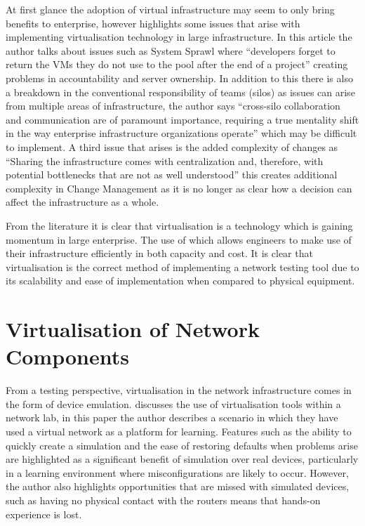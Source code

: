 \documentclass[11pt]{report}
\begin{document}
At first glance the adoption of virtual infrastructure may seem to only bring benefits to enterprise, however \citep{kotsovinos2010virtualization} highlights some issues that arise with implementing virtualisation technology in large infrastructure. In this article the author talks about issues such as System Sprawl where ``developers forget to return the VMs they do not use to the pool after the end of a project'' creating problems in accountability and server ownership. In addition to this there is also a breakdown in the conventional responsibility of teams (silos) as issues can arise from multiple areas of infrastructure, the author says ``cross-silo collaboration and communication are of paramount importance, requiring a true mentality shift in the way enterprise infrastructure organizations operate'' which may be difficult to implement. A third issue that arises is the added complexity of changes as ``Sharing the infrastructure comes with centralization and, therefore, with potential bottlenecks that are not as well understood'' this creates additional complexity in Change Management as it is no longer as clear how a decision can affect the infrastructure as a whole.

From the literature it is clear that virtualisation is a technology which is gaining momentum in large enterprise. The use of which allows engineers to make use of their infrastructure efficiently in both capacity and cost. It is clear that virtualisation is the correct method of implementing a network testing tool due to its scalability and ease of implementation when compared to physical equipment. 

\section{Virtualisation of Network Components}

From a testing perspective, virtualisation in the network infrastructure comes in the form of device emulation. \citep{galan2004use} discusses the use of virtualisation tools within a network lab, 
in this paper the author describes a scenario in which they have used a virtual network as a platform for learning. Features such as the ability to quickly create a simulation and the ease of restoring defaults when problems arise are highlighted as a significant benefit of simulation over real devices, particularly in a learning environment where misconfigurations are likely to occur. However, the author also highlights opportunities that are missed with simulated devices, such as having no physical contact with the routers means that hands-on experience is lost.
\end{document}
